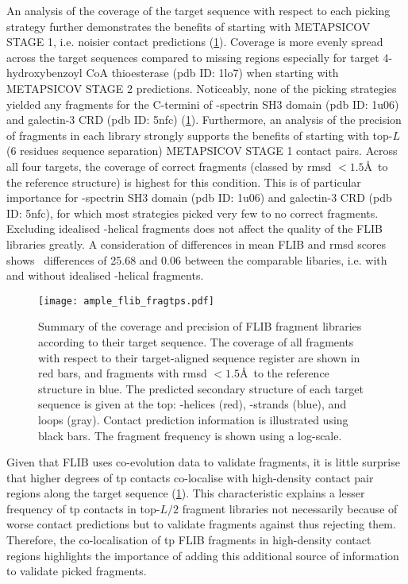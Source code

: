 An analysis of the coverage of the target sequence with respect to each picking strategy further demonstrates the benefits of starting with METAPSICOV STAGE 1, i.e. noisier contact predictions (\cref{fig:ample_flib_fragtps}). Coverage is more evenly spread across the target sequences compared to missing regions especially for target 4-hydroxybenzoyl CoA thioesterase (\gls{pdb} ID: 1lo7) when starting with METAPSICOV STAGE 2 predictions. Noticeably, none of the picking strategies yielded any fragments for the C-termini of \textalpha-spectrin SH3 domain (\gls{pdb} ID: 1u06) and galectin-3 CRD (\gls{pdb} ID: 5nfc) (\cref{fig:ample_flib_fragtps}). Furthermore, an analysis of the precision of fragments in each library strongly supports the benefits of starting with top-$L$ (6 residues sequence separation) METAPSICOV STAGE 1 contact pairs. Across all four targets, the coverage of correct fragments (classed by \gls{rmsd} $<1.5$\AA\ to the reference structure) is highest for this condition. This is of particular importance for \textalpha-spectrin SH3 domain (\gls{pdb} ID: 1u06) and galectin-3 CRD (\gls{pdb} ID: 5nfc), for which most strategies picked very few to no correct fragments. Excluding idealised \textalpha-helical fragments does not affect the quality of the FLIB libraries greatly. A consideration of differences in mean FLIB and \gls{rmsd} scores shows \textDelta\ differences of 25.68 and 0.06 between the comparable libaries, i.e. with and without idealised \textalpha-helical fragments.

\begin{figure}[H]
	\centering
	\texttt{[image: ample\_flib\_fragtps.pdf]}
	\caption[Coverage and precision of Flib fragment libraries]{Summary of the coverage and precision of FLIB fragment libraries according to their target sequence. The coverage of all fragments with respect to their target-aligned sequence register are shown in red bars, and fragments with \gls{rmsd} $<1.5$\AA\ to the reference structure in blue. The predicted secondary structure of each target sequence is given at the top: \textalpha-helices (red), \textbeta-strands (blue), and loops (gray). Contact prediction information is illustrated using black bars. The fragment frequency is shown using a log-scale.}
	\label{fig:ample_flib_fragtps}
\end{figure}

Given that FLIB uses co-evolution data to validate fragments, it is little surprise that higher degrees of \gls{tp} contacts co-localise with high-density contact pair regions along the target sequence (\cref{fig:ample_flib_fragtps}). This characteristic explains a lesser frequency of \gls{tp} contacts in top-$L/2$ fragment libraries not necessarily because of worse contact predictions but to validate fragments against thus rejecting them. Therefore, the co-localisation of \gls{tp} FLIB fragments in high-density contact regions highlights the importance of adding this additional source of information to validate picked fragments. 

